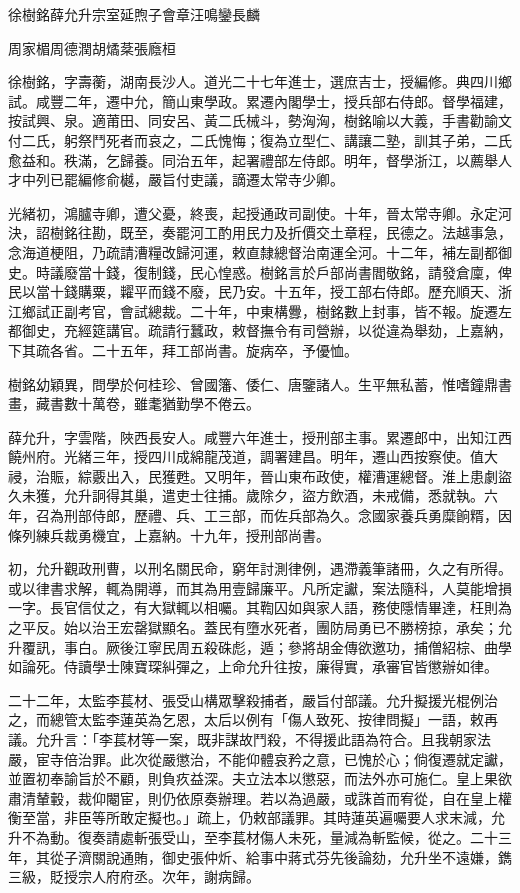 
\begin{pinyinscope}
徐樹銘薛允升宗室延煦子會章汪鳴鑾長麟

周家楣周德潤胡燏棻張廕桓

徐樹銘，字壽蘅，湖南長沙人。道光二十七年進士，選庶吉士，授編修。典四川鄉試。咸豐二年，遷中允，簡山東學政。累遷內閣學士，授兵部右侍郎。督學福建，按試興、泉。適莆田、同安呂、黃二氏械斗，勢洶洶，樹銘喻以大義，手書勸諭文付二氏，躬祭鬥死者而哀之，二氏愧悔；復為立型仁、講讓二塾，訓其子弟，二氏愈益和。秩滿，乞歸養。同治五年，起署禮部左侍郎。明年，督學浙江，以薦舉人才中列已罷編修俞樾，嚴旨付吏議，謫遷太常寺少卿。

光緒初，鴻臚寺卿，遭父憂，終喪，起授通政司副使。十年，晉太常寺卿。永定河決，詔樹銘往勘，既至，奏罷河工酌用民力及折價交土章程，民德之。法越事急，念海道梗阻，乃疏請漕糧改歸河運，敕直隸總督治南運全河。十二年，補左副都御史。時議廢當十錢，復制錢，民心惶惑。樹銘言於戶部尚書閻敬銘，請發倉廩，俾民以當十錢購粟，糶平而錢不廢，民乃安。十五年，授工部右侍郎。歷充順天、浙江鄉試正副考官，會試總裁。二十年，中東構釁，樹銘數上封事，皆不報。旋遷左都御史，充經筵講官。疏請行蠶政，敕督撫令有司營辦，以從違為舉劾，上嘉納，下其疏各省。二十五年，拜工部尚書。旋病卒，予優恤。

樹銘幼穎異，問學於何桂珍、曾國籓、倭仁、唐鑒諸人。生平無私蓄，惟嗜鐘鼎書畫，藏書數十萬卷，雖耄猶勤學不倦云。

薛允升，字雲階，陜西長安人。咸豐六年進士，授刑部主事。累遷郎中，出知江西饒州府。光緒三年，授四川成綿龍茂道，調署建昌。明年，遷山西按察使。值大祲，治賑，綜覈出入，民獲甦。又明年，晉山東布政使，權漕運總督。淮上患劇盜久未獲，允升詗得其巢，遣吏士往捕。歲除夕，盜方飲酒，未戒備，悉就執。六年，召為刑部侍郎，歷禮、兵、工三部，而佐兵部為久。念國家養兵勇糜餉糈，因條列練兵裁勇機宜，上嘉納。十九年，授刑部尚書。

初，允升觀政刑曹，以刑名關民命，窮年討測律例，遇滯義筆諸冊，久之有所得。或以律書求解，輒為開導，而其為用壹歸廉平。凡所定讞，案法隨科，人莫能增損一字。長官信仗之，有大獄輒以相囑。其鞫囚如與家人語，務使隱情畢達，枉則為之平反。始以治王宏罄獄顯名。蓋民有墮水死者，團防局勇已不勝榜掠，承矣；允升覆訊，事白。厥後江寧民周五殺硃彪，遁；參將胡金傳欲邀功，捕僧紹棕、曲學如論死。侍讀學士陳寶琛糾彈之，上命允升往按，廉得實，承審官皆懲辦如律。

二十二年，太監李萇材、張受山構眾擊殺捕者，嚴旨付部議。允升擬援光棍例治之，而總管太監李蓮英為乞恩，太后以例有「傷人致死、按律問擬」一語，敕再議。允升言：「李萇材等一案，既非謀故鬥殺，不得援此語為符合。且我朝家法嚴，宦寺倍治罪。此次從嚴懲治，不能仰體哀矜之意，已愧於心；倘復遷就定讞，並置初奉諭旨於不顧，則負疚益深。夫立法本以懲惡，而法外亦可施仁。皇上果欲肅清輦轂，裁仰閹宦，則仍依原奏辦理。若以為過嚴，或誅首而宥從，自在皇上權衡至當，非臣等所敢定擬也。」疏上，仍敕部議罪。其時蓮英遍囑要人求末減，允升不為動。復奏請處斬張受山，至李萇材傷人未死，量減為斬監候，從之。二十三年，其從子濟關說通賄，御史張仲炘、給事中蔣式芬先後論劾，允升坐不遠嫌，鐫三級，貶授宗人府府丞。次年，謝病歸。


\end{pinyinscope}
